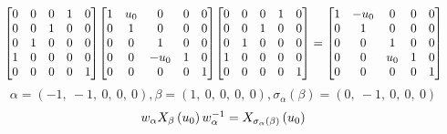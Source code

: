 \documentclass[11pt]{article}
\theoremstyle{definition}
\begin{document}
\[
\scaletoalign{\textwidth}{{\left[\begin{matrix}0 & 0 & 0 & 1 & 0\\0 & 0 & 1 & 0 & 0\\0 & 1 & 0 & 0 & 0\\1 & 0 & 0 & 0 & 0\\0 & 0 & 0 & 0 & 1\end{matrix}\right]} {\left[\begin{matrix}1 & u_{0} & 0 & 0 & 0\\0 & 1 & 0 & 0 & 0\\0 & 0 & 1 & 0 & 0\\0 & 0 & - u_{0} & 1 & 0\\0 & 0 & 0 & 0 & 1\end{matrix}\right]} {\left[\begin{matrix}0 & 0 & 0 & 1 & 0\\0 & 0 & 1 & 0 & 0\\0 & 1 & 0 & 0 & 0\\1 & 0 & 0 & 0 & 0\\0 & 0 & 0 & 0 & 1\end{matrix}\right]} = {\left[\begin{matrix}1 & - u_{0} & 0 & 0 & 0\\0 & 1 & 0 & 0 & 0\\0 & 0 & 1 & 0 & 0\\0 & 0 & u_{0} & 1 & 0\\0 & 0 & 0 & 0 & 1\end{matrix}\right]}}
\]
\[
\alpha = \left( -1, \  -1, \  0, \  0, \  0\right), \beta = \left( 1, \  0, \  0, \  0, \  0\right), \sigma_{\alpha}(\beta) = \left( 0, \  -1, \  0, \  0, \  0\right)
\]
\[
\scaletoalign{\textwidth}{w_{\alpha} X_{\beta}\left(u_{0}\right) w_{\alpha}^{-1} = X_{\sigma_{\alpha}\left(\beta\right)}\left(u_{0}\right)}
\]
\end{document}
